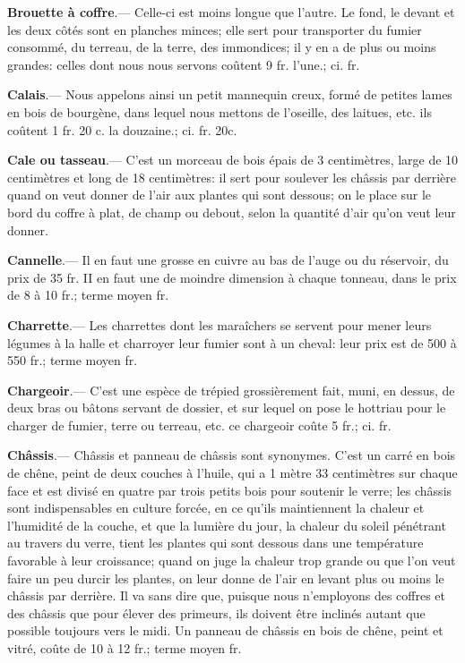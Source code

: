\documentclass[10pt,a4paper]{book}
\begin{document}
\textbf{Brouette à coffre}.--- Celle-ci est moins longue que l'autre. Le fond, le devant et les deux côtés sont en planches minces; elle sert pour transporter du fumier consommé, du terreau, de la terre, des immondices; il y en a de plus ou moins grandes: celles dont nous nous servons coûtent 9 fr. l'une.; ci. fr.

\textbf{Calais}.--- Nous appelons ainsi un petit mannequin creux, formé de petites lames en bois de bourgène, dans lequel nous mettons de l'oseille, des laitues, etc. ils coûtent 1 fr. 20 c. la douzaine.; ci. fr. 20c.

\textbf{Cale ou tasseau}.--- C'est un morceau de bois épais de 3 centimètres, large de 10 centimètres et long de 18 centimètres: il sert pour soulever les châssis par derrière quand on veut donner de l'air aux plantes qui sont dessous; on le place sur le bord du coffre à plat, de champ ou debout, selon la quantité d'air qu'on veut leur donner.

\textbf{Cannelle}.--- Il en faut une grosse en cuivre au bas de l'auge ou du réservoir, du prix de 35 fr. II en faut une de moindre dimension à chaque tonneau, dans le prix de 8 à 10 fr.; terme moyen  fr.

\textbf{Charrette}.--- Les charrettes dont les maraîchers se servent pour mener leurs légumes à la halle et charroyer leur fumier sont à un cheval: leur prix est de 500 à 550 fr.; terme moyen  fr.

\textbf{Chargeoir}.--- C'est une espèce de trépied grossièrement fait, muni, en dessus, de deux bras ou bâtons servant de dossier, et sur lequel on pose le hottriau pour le charger de fumier, terre ou terreau, etc. ce chargeoir coûte 5 fr.; ci. fr.

\textbf{Châssis}.--- Châssis et panneau de châssis sont synonymes. C'est un carré en bois de chêne, peint de deux couches à l'huile, qui a 1 mètre 33 centimètres sur chaque face et est divisé en quatre par trois petits bois pour soutenir le verre; les châssis sont indispensables en culture forcée, en ce qu'ils maintiennent la chaleur et l'humidité de la couche, et que la lumière du jour, la chaleur du soleil pénétrant au travers du verre, tient les plantes qui sont dessous dans une température favorable à leur croissance; quand on juge la chaleur trop grande ou que l'on veut faire un peu durcir les plantes, on leur donne de l'air en levant plus ou moins le châssis par derrière. Il va sans dire que, puisque nous n'employons des coffres et des châssis que pour élever des primeurs, ils doivent être inclinés autant que possible toujours vers le midi. Un panneau de châssis en bois de chêne, peint et vitré, coûte de 10 à 12 fr.; terme moyen  fr.
\end{document}
